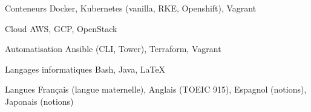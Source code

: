 

\begin{cvskills}

  \cvskill
    {Conteneurs} %
    {Docker, Kubernetes (vanilla, RKE, Openshift), Vagrant} %

  \cvskill
    {Cloud} %
    {AWS, GCP, OpenStack} %

  \cvskill
    {Automatisation} %
    {Ansible (CLI, Tower), Terraform, Vagrant} %

  \cvskill
    {Langages informatiques} %
    {Bash, Java, LaTeX} %

  \cvskill
    {Langues} %
    {Français (langue maternelle), Anglais (TOEIC 915), Espagnol (notions), Japonais (notions)} %

\end{cvskills}
